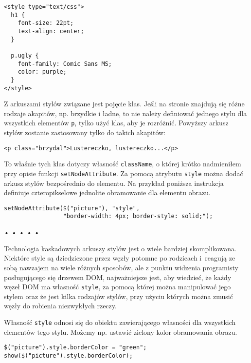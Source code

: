  
\begin{verbatim} 
<style type="text/css">
  h1 {
    font-size: 22pt;
    text-align: center;
  }

  p.ugly {
    font-family: Comic Sans MS;
    color: purple;
  }
</style>
\end{verbatim}
  
Z arkuszami stylów związane jest pojęcie klas. Jeśli na stronie znajdują się różne rodzaje akapitów, np. brzydkie i ładne, to nie należy definiować jednego stylu dla wszystkich elementów \texttt{p}, tylko użyć klas, aby je rozróżnić. Powyższy arkusz stylów zostanie zastosowany tylko do takich akapitów:

  
\begin{verbatim} 
<p class="brzydal">Lustereczko, lustereczko...</p>
\end{verbatim}
  
To właśnie tych klas dotyczy własność \texttt{className}, o której krótko nadmieniłem przy opisie funkcji \texttt{setNodeAttribute}. Za pomocą atrybutu \texttt{style} można dodać arkusz stylów bezpośrednio do elementu. Na przykład poniższa instrukcja definiuje czteropikselowe jednolite obramowanie dla elementu obrazu.

  
\begin{verbatim} 
setNodeAttribute($("picture"), "style",
                 "border-width: 4px; border-style: solid;");
\end{verbatim}


\begin{center}
• • • • •
\end{center}

  
Technologia kaskadowych arkuszy stylów jest o wiele bardziej skomplikowana. Niektóre style są dziedziczone przez węzły potomne po rodzicach i~reagują ze sobą nawzajem na wiele różnych sposobów, ale z punktu widzenia programisty posługującego się drzewem DOM, najważniejsze jest, aby wiedzieć, że każdy węzeł DOM ma własność \texttt{style}, za pomocą której można manipulować jego stylem oraz że jest kilka rodzajów stylów, przy użyciu których można zmusić węzły do robienia niezwykłych rzeczy.

  
Własność \texttt{style} odnosi się do obiektu zawierającego własności dla wszystkich elementów tego stylu. Możemy np. ustawić zielony kolor obramowania obrazu.

  
\begin{verbatim} 
$("picture").style.borderColor = "green";
show($("picture").style.borderColor);
\end{verbatim}
  
